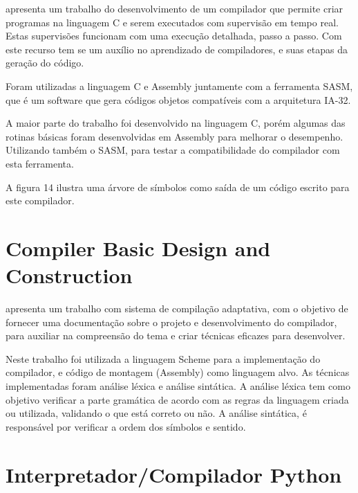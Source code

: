\documentclass[12pt,oneside,a4paper,chapter=TITLE,section=TITLE,sumario=tradicional]{abntex2}
\begin{document}
\cite{juliano2009} apresenta um trabalho do desenvolvimento de um compilador que permite criar programas na linguagem C e serem executados com supervisão em tempo real. Estas supervisões funcionam com uma execução detalhada, passo a passo. Com este recurso tem se um auxílio no aprendizado de compiladores, e suas etapas da geração do código.

Foram utilizadas a linguagem C e Assembly juntamente com a ferramenta SASM, que é um software que gera códigos objetos compatíveis com a arquitetura IA-32.

A maior parte do trabalho foi desenvolvido na linguagem C, porém algumas das rotinas básicas foram desenvolvidas em Assembly para melhorar o desempenho. Utilizando também o SASM, para testar a compatibilidade do compilador com esta ferramenta.

A figura 14 ilustra uma árvore de símbolos como saída de um código escrito para este compilador. 

\begin{figure}[htb]
\end{figure}

\section{Compiler Basic Design and Construction}
\label{sec:compiler-basic}

\cite{mahak2009} apresenta um trabalho com sistema de compilação adaptativa, com o objetivo de fornecer uma documentação sobre o projeto e desenvolvimento do compilador, para auxiliar na compreensão do tema e criar técnicas eficazes para desenvolver.

Neste trabalho foi utilizada a linguagem Scheme para a implementação do compilador, e código de montagem (Assembly) como linguagem alvo. As técnicas implementadas foram análise léxica e análise sintática. A análise léxica tem como objetivo verificar a parte gramática de acordo com as regras da linguagem criada ou utilizada, validando o que está correto ou não. A análise sintática, é responsável por verificar a ordem dos símbolos e sentido.

\section{ Interpretador/Compilador Python}
\label{sec:interpretador-compilador}
\end{document}
